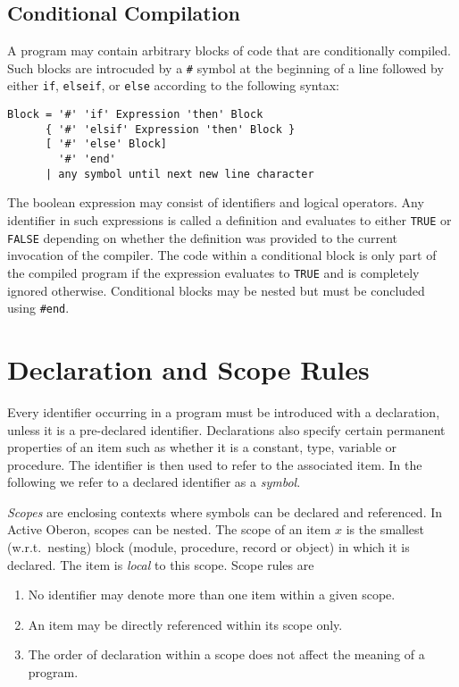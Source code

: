 \documentclass[a4wide,11pt]{article}
\begin{document}
\subsection{Conditional Compilation}

A program may contain arbitrary blocks of code that are conditionally compiled.
Such blocks are introcuded by a \lstinline"#" symbol at the beginning of a line followed by either \lstinline"if", \lstinline"elseif", or \lstinline"else" according to the following syntax:

\begin{lstlisting}[style = ebnf]
Block = '#' 'if' Expression 'then' Block
      { '#' 'elsif' Expression 'then' Block }
      [ '#' 'else' Block]
        '#' 'end'
      | any symbol until next new line character
\end{lstlisting}

The boolean expression may consist of identifiers and logical operators.
Any identifier in such expressions is called a definition and evaluates to either \lstinline"TRUE" or  \lstinline"FALSE" depending on whether the definition was provided to the current invocation of the compiler.
The code within a conditional block is only part of the compiled program if the expression evaluates to \lstinline"TRUE" and is completely ignored otherwise.
Conditional blocks may be nested but must be concluded using \lstinline"#end".

\section{Declaration and Scope Rules}
Every identifier occurring in a program must be introduced with a declaration, unless it is a pre-declared identifier.
Declarations also specify certain permanent properties of an item such as whether it is a constant, type, variable or procedure.
The identifier is then used to refer to the associated item.
In the following we refer to a declared identifier as a \emph{symbol}.

\emph{Scopes} are enclosing contexts where symbols can be declared and referenced.
In Active Oberon, scopes can be nested.
The scope of an item $x$ is the smallest (w.r.t.\ nesting) block (module, procedure, record or object) in which it is declared.
The item is \emph{local} to this scope.
Scope rules are
\begin{enumerate}
\item No identifier may denote more than one item within a given scope.
\item An item may be directly referenced within its scope only.
\item The order of declaration within a scope does not affect the meaning of a program.
\end{enumerate}
\end{document}
